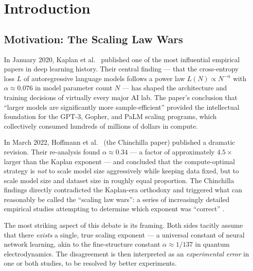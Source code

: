 \documentclass[12pt,a4paper]{article}
\theoremstyle{remark}
\begin{document}
\begin{abstract}
\vspace{4pt}
\noindent\textbf{Keywords:} neural scaling laws, gauge theory, Chinchilla, Kaplan, compute-optimal frontier, Cercis score, SCX framework, irreducible uncertainty, multi-expert audit
\end{abstract}

\section{Introduction}

\subsection{Motivation: The Scaling Law Wars}

In January 2020, Kaplan et al.\ \cite{kaplan2020scaling} published one of the most influential empirical papers in deep learning history. Their central finding — that the cross-entropy loss $L$ of autoregressive language models follows a power law $L(N) \propto N^{-\alpha}$ with $\alpha \approx 0.076$ in model parameter count $N$ — has shaped the architecture and training decisions of virtually every major AI lab. The paper's conclusion that ``larger models are significantly more sample-efficient'' provided the intellectual foundation for the GPT-3, Gopher, and PaLM scaling programs, which collectively consumed hundreds of millions of dollars in compute.

In March 2022, Hoffmann et al.\ \cite{hoffmann2022training} (the Chinchilla paper) published a dramatic revision. Their re-analysis found $\alpha \approx 0.34$ — a factor of approximately $4.5\times$ larger than the Kaplan exponent — and concluded that the compute-optimal strategy is \emph{not} to scale model size aggressively while keeping data fixed, but to scale model size and dataset size in roughly equal proportion. The Chinchilla findings directly contradicted the Kaplan-era orthodoxy and triggered what can reasonably be called the ``scaling law wars'': a series of increasingly detailed empirical studies attempting to determine which exponent was ``correct'' \cite{besiroglu2024chinchilla, porian2024resolving, sorscher2022beyond, muennighoff2024scaling}.

The most striking aspect of this debate is its framing. Both sides tacitly assume that there \emph{exists} a single, true scaling exponent — a universal constant of neural network learning, akin to the fine-structure constant $\alpha \approx 1/137$ in quantum electrodynamics. The disagreement is then interpreted as an \emph{experimental error} in one or both studies, to be resolved by better experiments.
\end{document}
